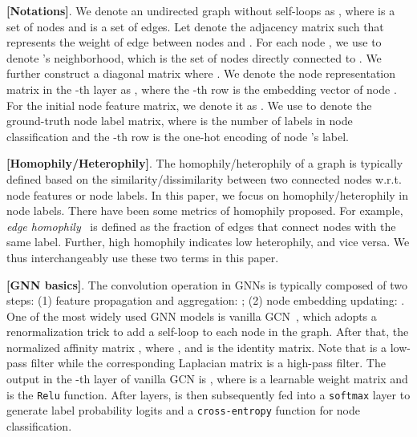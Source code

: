 \documentclass[nohyperref]{article}
\theoremstyle{plain}
\theoremstyle{definition}
\theoremstyle{remark}
\begin{document}
\noindent \textbf{[Notations]}.
We denote an undirected graph without self-loops as ,
where  is a set of nodes and
 is a set of edges.
Let  denote the adjacency matrix such that 
 represents the weight of edge  between nodes  and .
For each node ,
we use  to denote 's neighborhood,
which is the set of nodes directly connected to .
We further construct a diagonal matrix  where .
We denote the node representation matrix in the -th layer as ,
where the -th row is the embedding vector  of node .
For the initial node feature matrix,
we denote it as .
We use  to denote the ground-truth node label matrix,
where  is the number of labels in node classification and
the -th row  is the one-hot encoding of node 's label.


\noindent \textbf{[Homophily/Heterophily]}.
The homophily/heterophily of a graph is typically defined 
based on the similarity/dissimilarity between two connected nodes w.r.t. node features or node labels.
In this paper,
we focus on homophily/heterophily in node labels.
There have been some metrics of homophily proposed.
For example,
\emph{edge homophily}~\cite{zhu2020beyond} is defined as the fraction of edges that connect nodes with the same label.
Further,
high homophily indicates low heterophily, and vice versa.
We thus interchangeably use these two terms in this paper.


\noindent \textbf{[GNN basics]}.
The convolution operation in GNNs is typically composed of two steps:
(1) feature propagation and aggregation:
;
(2) node embedding updating:
.
One of the most widely used GNN models is  
vanilla GCN~\cite{kipf2016semi},
which adopts a renormalization trick to add a self-loop to each node in the graph.
After that,
the normalized affinity matrix ,
where ,  and  is the identity matrix.
Note that  is a low-pass filter while the corresponding Laplacian matrix  is a high-pass filter.
The output in the -th layer of vanilla GCN is 
,
where  is a learnable weight matrix and  is the \texttt{Relu} function.
After  layers,
 is then subsequently fed into a \texttt{softmax} layer to generate label probability logits and 
a \texttt{cross-entropy} function for node classification.
\end{document}
